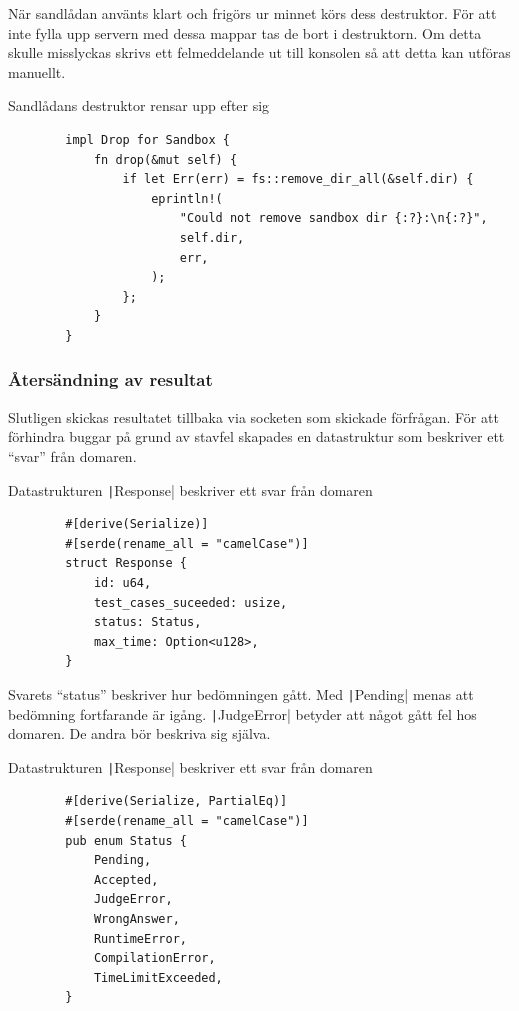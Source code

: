 \documentclass{article}
\begin{document}
När sandlådan använts klart och frigörs ur minnet körs dess destruktor. För att
inte fylla upp servern med dessa mappar tas de bort i destruktorn. Om detta
skulle misslyckas skrivs ett felmeddelande ut till konsolen så att detta kan
utföras manuellt.

\begin{listing}[H]
	\caption{Sandlådans destruktor rensar upp efter sig}
	\begin{verbatim}
		impl Drop for Sandbox {
			fn drop(&mut self) {
				if let Err(err) = fs::remove_dir_all(&self.dir) {
					eprintln!(
						"Could not remove sandbox dir {:?}:\n{:?}",
						self.dir,
						err,
					);
				};
			}
		}
	\end{verbatim}
\end{listing}

\subsubsection{Återsändning av resultat}

Slutligen skickas resultatet tillbaka via socketen som skickade förfrågan. För
att förhindra buggar på grund av stavfel skapades en datastruktur som beskriver
ett ``svar'' från domaren.

\begin{listing}[H]
	\caption{Datastrukturen \texttt|Response| beskriver ett svar från domaren}
	\begin{verbatim}
		#[derive(Serialize)]
		#[serde(rename_all = "camelCase")]
		struct Response {
			id: u64,
			test_cases_suceeded: usize,
			status: Status,
			max_time: Option<u128>,
		}
	\end{verbatim}
\end{listing}

Svarets ``status'' beskriver hur bedömningen gått. Med
\texttt|Pending| menas
att bedömning fortfarande är igång. \texttt|JudgeError| betyder att något gått
fel hos domaren. De andra bör beskriva sig själva.

\begin{listing}[H]
	\caption{Datastrukturen \texttt|Response| beskriver ett svar från domaren}
	\label{status-enum}
	\begin{verbatim}
		#[derive(Serialize, PartialEq)]
		#[serde(rename_all = "camelCase")]
		pub enum Status {
			Pending,
			Accepted,
			JudgeError,
			WrongAnswer,
			RuntimeError,
			CompilationError,
			TimeLimitExceeded,
		}
	\end{verbatim}
\end{listing}
\end{document}
